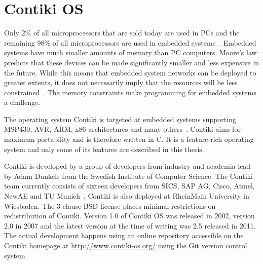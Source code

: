 
\chapter{Contiki OS}
Only 2\% of all microprocessors that are sold today are used in PCs and the remaining 98\%
of all microprocessors are used in embedded systems~\cite{thesis-programming}.
Embedded systems have much smaller amounts of memory than PC computers.
Moore's law predicts that these devices
can be made significantly smaller and less expensive in the future.
While this means that embedded system networks can
be deployed to greater extents, it does not necessarily imply
that the resources will be less constrained~\cite{paper-contiki}.
The memory constraints make programming for embedded systems a challenge.

The operating system Contiki is targeted at embedded systems supporting MSP430, AVR, ARM, x86
architectures and many others~\cite{contiki-docs}.
Contiki aims for maximum portability and is therefore written in C.
It is a feature-rich operating system and
only some of its features are described in this thesis.

Contiki is developed by a group of developers from industry and academia
lead by Adam Dunkels from the Swedish Institute of Computer Science.
The Contiki team currently consists of sixteen developers from SICS,
SAP AG, Cisco, Atmel, NewAE and TU Munich~\cite{contiki-docs}.
Contiki is also deployed at RheinMain University in Wiesbaden.
The 3-clause BSD license places minimal restrictions on redistribution of Contiki.
Version 1.0 of Contiki OS was released in 2002, version 2.0 in 2007 and the latest version
at the time of writing was 2.5 released in 2011.
The actual development happens using an online repository accessible on the Contiki homepage at \url{http://www.contiki-os.org/}
using the Git version control system.










